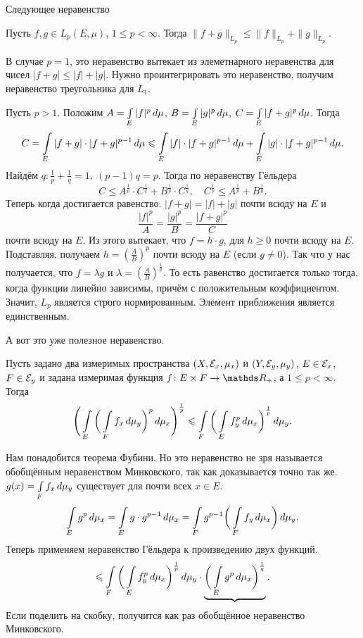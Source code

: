 Следующее неравенство
\begin{Ut}
  Пусть $f,g\in L_p(E,\mu)$, $1\le p<\infty$. Тогда $\|f+g\|_{L_p}\le \|f\|_{L_p}+\|g\|_{L_p}$.
\end{Ut}
\begin{Proof}
  В случае $p=1$, это неравенство вытекает из элеметнарного неравенства для чисел $|f+g|\le |f|+|g|$. Нужно проинтегрировать это неравенство, получим неравенство треугольника для $L_1$.

Пусть $p>1$. Положим $A = \int\limits_{E}|f|^p\,d\mu$, $B = \int\limits_{E}|g|^p\,d\mu$, $C = \int\limits_{E}|f+g|^p\,d\mu$. Тогда 
\[
  C = \int\limits_{E}|f+g|\cdot |f+g|^{p-1}\,d\mu\leqslant \int\limits_{E}|f|\cdot |f+g|^{p-1}\,d\mu+\int\limits_{E}|g|\cdot |f+g|^{p-1}\,d\mu.
\]
Найдём $q\colon \frac1p+\frac1q =1,\ (p-1)q = p$. Тогда по неравенству Гёльдера
\[
  C\le A^{\frac1p}\cdot C^{\frac1q} + B^{\frac1p}\cdot C^{\frac 1q}, \quad C^{\frac1p}\le A^{\frac1p} + B^{\frac1p}.
\]
Теперь когда достигается равенство. $|f+g| = |f|+|g|$ почти всюду на $E$ и 
\[
  \frac{|f|^p}A = \frac{|g|^p}B = \frac{|f+g|^p}C
\]
почти всюду на $E$. Из этого вытекает, что $f = h\cdot g $, для $h\ge 0$ почти всюду на $E$. Подставляя, получаем $h = \left(\frac AB\right)^p$ почти всюду на $E$ (если $g\ne 0$). Так что у нас получается, что $f=\lambda g$ и  $\lambda = \left(\frac AB\right)^{\frac1p}$. То есть равенство достигается только тогда, когда функции линейно зависимы, причём с положительным коэффициентом. Значит, $L_p$ является строго нормированным. Элемент приближения является единственным.
\end{Proof}

А вот это уже полезное неравенство.
\begin{Ut}\label{obobMink}
  Пусть задано два измеримых пространства $(X,\mathcal E_x,\mu_x)$ и $(Y,\mathcal E_y,\mu_y)$, $E\in\mathcal E_x$, $F\in \mathcal E_y$ и задана измеримая функция $f\colon E\times F\to \R_+$, а $1\le p<\infty$. Тогда
\[
  \Bigg(\int\limits_{E}\bigg(\int\limits_{F}f_x\,d\mu_y\bigg)^p\,d\mu_x\Bigg)^{\frac1p}\leqslant \int\limits_{F}\bigg(\int\limits_{E}f_y^p\,d\mu_x\bigg)^{\frac1p}\,d\mu_y.
\]
\end{Ut}
\begin{Proof}
  Нам понадобится теорема Фубини. Но это неравенство не зря называется обобщённым неравенством Минковского, так как доказывается точно так же. $g(x) = \int\limits_{F}f_x\,d\mu_y$ существует для почти всех $x\in E$.
\[
  \int\limits_{E}g^p\,d\mu_x = \int\limits_{E}g\cdot g^{p-1}\,d\mu_x = \int\limits_{F}g^{p-1}\bigg(\int\limits_{F}f_y\,d\mu_x\bigg)\,d\mu_y.
\]
Теперь применяем неравенство Гёльдера к произведению двух функций.
\[
 \leqslant \int\limits_{F}\bigg(\int\limits_{E} f_y^p\,d\mu_x\bigg)^{\frac1p}\,d\mu_y\cdot \underbrace{\bigg(\int\limits_{E}g^p\,d\mu_x\bigg)^{\frac1q}}.
\]
Если поделить на скобку, получится как раз обобщённое неравенство Минковского.
\end{Proof}

